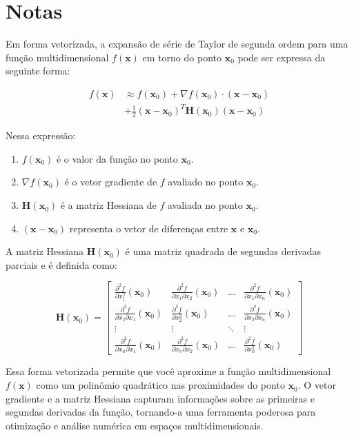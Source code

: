 \documentclass{article}
\begin{document}
\section{Notas}

Em forma vetorizada, a expansão de série de Taylor de segunda ordem para uma função multidimensional \(f(\mathbf{x})\) em torno do ponto \(\mathbf{x}_0\) pode ser expressa da seguinte forma:

\[
\begin{split}
f(\mathbf{x}) &\approx f(\mathbf{x}_0) + \nabla f(\mathbf{x}_0) \cdot (\mathbf{x} - \mathbf{x}_0) \\
&+ \frac{1}{2}(\mathbf{x} - \mathbf{x}_0)^T \mathbf{H}(\mathbf{x}_0)(\mathbf{x} - \mathbf{x}_0)
\end{split}
\]

Nessa expressão:

\begin{enumerate}
    \item \(f(\mathbf{x}_0)\) é o valor da função no ponto \(\mathbf{x}_0\).
    \item  \(\nabla f(\mathbf{x}_0)\) é o vetor gradiente de \(f\) avaliado no ponto \(\mathbf{x}_0\).
    \item  \(\mathbf{H}(\mathbf{x}_0)\) é a matriz Hessiana de \(f\) avaliada no ponto \(\mathbf{x}_0\).
    \item  \((\mathbf{x} - \mathbf{x}_0)\) representa o vetor de diferenças entre \(\mathbf{x}\) e \(\mathbf{x}_0\).
\end{enumerate}


A matriz Hessiana \(\mathbf{H}(\mathbf{x}_0)\) é uma matriz quadrada de segundas derivadas parciais e é definida como:

\[
\mathbf{H}(\mathbf{x}_0) = \begin{bmatrix}
\frac{\partial^2 f}{\partial x_1^2}(\mathbf{x}_0) & \frac{\partial^2 f}{\partial x_1 \partial x_2}(\mathbf{x}_0) & \ldots & \frac{\partial^2 f}{\partial x_1 \partial x_n}(\mathbf{x}_0) \\
\frac{\partial^2 f}{\partial x_2 \partial x_1}(\mathbf{x}_0) & \frac{\partial^2 f}{\partial x_2^2}(\mathbf{x}_0) & \ldots & \frac{\partial^2 f}{\partial x_2 \partial x_n}(\mathbf{x}_0) \\
\vdots & \vdots & \ddots & \vdots \\
\frac{\partial^2 f}{\partial x_n \partial x_1}(\mathbf{x}_0) & \frac{\partial^2 f}{\partial x_n \partial x_2}(\mathbf{x}_0) & \ldots & \frac{\partial^2 f}{\partial x_n^2}(\mathbf{x}_0)
\end{bmatrix}
\]

Essa forma vetorizada permite que você aproxime a função multidimensional \(f(\mathbf{x})\) como um polinômio quadrático nas proximidades do ponto \(\mathbf{x}_0\). O vetor gradiente e a matriz Hessiana capturam informações sobre as primeiras e segundas derivadas da função, tornando-a uma ferramenta poderosa para otimização e análise numérica em espaços multidimensionais.



%
%
\end{document}
